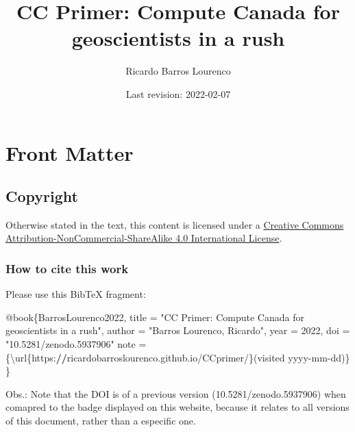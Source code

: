 \documentclass[
]{book}
\title{CC Primer: Compute Canada for geoscientists in a rush}
\author{Ricardo Barros Lourenco}
\date{Last revision: 2022-02-07}
\newenvironment{Shaded}{\begin{snugshade}}{\end{snugshade}}
\newcommand{\DecValTok}[1]{\textcolor[rgb]{0.00,0.00,0.81}{#1}}
\newcommand{\ErrorTok}[1]{\textcolor[rgb]{0.64,0.00,0.00}{\textbf{#1}}}
\newcommand{\NormalTok}[1]{#1}
\newcommand{\OtherTok}[1]{\textcolor[rgb]{0.56,0.35,0.01}{#1}}
\newcommand{\SpecialCharTok}[1]{\textcolor[rgb]{0.00,0.00,0.00}{#1}}
\newcommand{\StringTok}[1]{\textcolor[rgb]{0.31,0.60,0.02}{#1}}
\begin{document}
\maketitle

{
\setcounter{tocdepth}{1}
\tableofcontents
}
\hypertarget{front-matter}{%
\chapter{Front Matter}\label{front-matter}}

\hypertarget{copyright}{%
\section{Copyright}\label{copyright}}

Otherwise stated in the text, this content is licensed under a \href{http://creativecommons.org/licenses/by-nc-sa/4.0/}{Creative Commons Attribution-NonCommercial-ShareAlike 4.0 International License}.

\hypertarget{how-to-cite-this-work}{%
\subsection{How to cite this work}\label{how-to-cite-this-work}}

Please use this BibTeX fragment:

\begin{Shaded}
\begin{Highlighting}[]
\SpecialCharTok{@}\NormalTok{book\{BarrosLourenco2022,}
\NormalTok{  title     }\OtherTok{=} \StringTok{"CC Primer: Compute Canada for geoscientists in a rush"}\NormalTok{,}
\NormalTok{  author    }\OtherTok{=} \StringTok{"Barros Lourenco, Ricardo"}\NormalTok{,}
\NormalTok{  year      }\OtherTok{=} \DecValTok{2022}\NormalTok{,}
\NormalTok{  doi       }\OtherTok{=} \StringTok{"10.5281/zenodo.5937906"}
\NormalTok{  note      }\OtherTok{=}\NormalTok{ \{\textbackslash{}url\{https}\SpecialCharTok{:}\ErrorTok{//}\NormalTok{ricardobarroslourenco.github.io}\SpecialCharTok{/}\NormalTok{CCprimer}\SpecialCharTok{/}\NormalTok{\}(visited yyyy}\SpecialCharTok{{-}}\NormalTok{mm}\SpecialCharTok{{-}}\NormalTok{dd)\}}
\NormalTok{\}}
\end{Highlighting}
\end{Shaded}

Obs.: Note that the DOI is of a previous version (10.5281/zenodo.5937906) when
comapred to the badge displayed on this website, because it relates to all versions
of this document, rather than a especific one.
\end{document}
